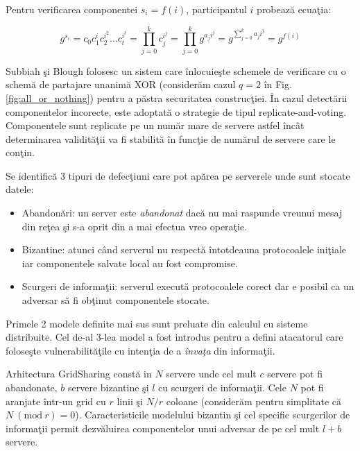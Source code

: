 \documentclass{llncs}
\newcommand{\Mod}[1]{\ (\text{mod}\ #1)}
\begin{document}
Pentru verificarea componentei $s_i = f(i)$, participantul $i$ probeaz\u{a} ecua\c{t}ia:

\begin{equation}
	g^{s_i} = c_0c_1^ic_2^{i^2} \dots c_t^{i^t} = \prod_{j=0}^k c_j^{i^j} = \prod_{j=0}^k g^{a_ji^j} = g^{\sum\limits_{j=0}^k a_ji^j} = g^{f(i)}
\end{equation}

Subbiah \c{s}i Blough folosesc un sistem care \^{i}nlocuie\c{s}te schemele de verificare cu o schem\u{a} de partajare unanim\u{a} XOR (consider\u{a}m cazul $q = 2$ \^{i}n Fig. \ref{fig:all_or_nothing}) pentru a p\u{a}stra securitatea construc\c{t}iei.
\^{I}n cazul detect\u{a}rii componentelor incorecte, este adoptat\u{a} o strategie de tipul replicate-and-voting.
Componentele sunt replicate pe un num\u{a}r mare de servere astfel \^{i}nc\^{a}t determinarea validit\u{a}\c{t}ii va fi stabilit\u{a} \^{i}n func\c{t}ie de num\u{a}rul de servere care le con\c{t}in.

Se identific\u{a} 3 tipuri de defec\c{t}iuni care pot ap\u{a}rea pe serverele unde sunt stocate datele:
\begin{itemize}
	\item Abandon\u{a}ri: un server este \textit{abandonat} dac\u{a} nu mai raspunde vreunui mesaj din re\c{t}ea \c{s}i s-a oprit din a mai efectua vreo opera\c{t}ie.
	\item Bizantine: atunci c\^{a}nd serverul nu respect\u{a} \^{i}ntotdeauna protocoalele ini\c{t}iale iar componentele salvate local au fost compromise.
	\item Scurgeri de informa\c{t}ii: serverul execut\u{a} protocoalele corect dar e posibil ca un adversar s\u{a} fi ob\c{t}inut componentele stocate.
\end{itemize}
Primele 2 modele definite mai sus sunt preluate din calculul cu sisteme distribuite. Cel de-al 3-lea model a fost introdus pentru a defini atacatorul care folose\c{s}te vulnerabilit\u{a}\c{t}ile cu inten\c{t}ia de a \textit{\^{i}nva\c{t}a} din informa\c{t}ii.

Arhitectura GridSharing const\u{a} in $N$ servere unde cel mult $c$ servere pot fi abandonate, $b$ servere bizantine \c{s}i $l$ cu scurgeri de informa\c{t}ii. Cele $N$ pot fi aranjate \^{i}ntr-un grid cu $r$ linii \c{s}i $N/r$ coloane (consider\u{a}m pentru simplitate c\u{a} $N \Mod r = 0$). Caracteristicile modelului bizantin \c{s}i cel specific scurgerilor de informa\c{t}ii permit dezv\u{a}luirea componentelor unui adversar de pe cel mult $l + b$ servere.
\end{document}
